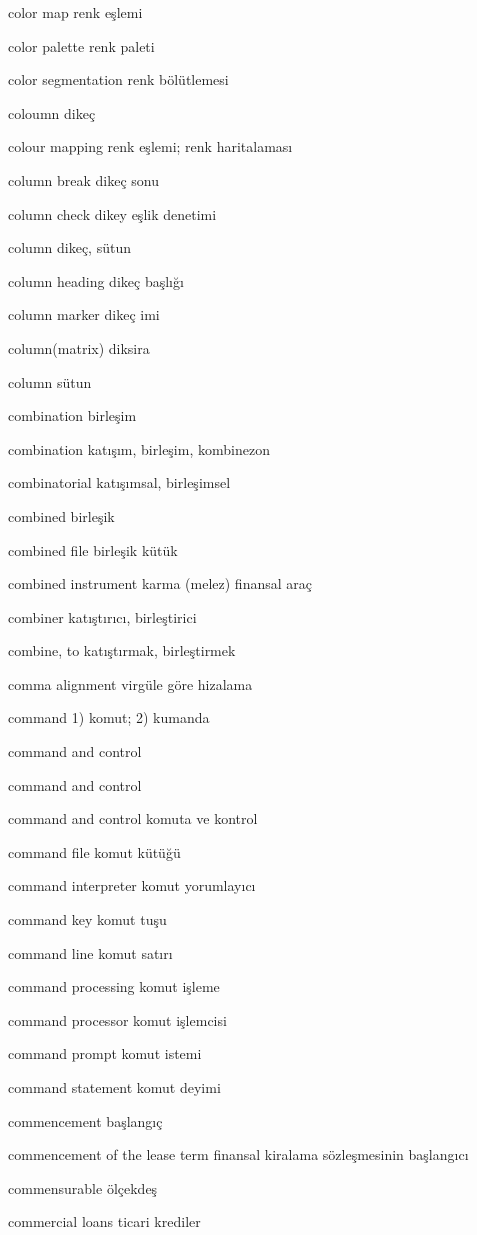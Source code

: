 \documentclass[12pt,fleqn]{article}\usepackage{../../common}
\begin{document}
color map renk eşlemi

color palette renk paleti

color segmentation renk bölütlemesi

coloumn dikeç

colour mapping renk eşlemi; renk haritalaması

column break dikeç sonu

column check dikey eşlik denetimi

column dikeç, sütun

column heading dikeç başlığı

column marker dikeç imi

column(matrix) diksira

column sütun

combination birleşim

combination katışım, birleşim, kombinezon

combinatorial katışımsal, birleşimsel

combined birleşik

combined file birleşik kütük

combined instrument karma (melez) finansal araç

combiner katıştırıcı, birleştirici

combine, to katıştırmak, birleştirmek

comma alignment virgüle göre hizalama

command 1) komut; 2) kumanda

command and control

command and control

command and control komuta ve kontrol

command file komut kütüğü

command interpreter komut yorumlayıcı

command key komut tuşu

command line komut satırı

command processing komut işleme

command processor komut işlemcisi

command prompt komut istemi

command statement komut deyimi

commencement başlangıç

commencement of the lease term finansal kiralama sözleşmesinin başlangıcı

commensurable ölçekdeş

commercial loans ticari krediler
\end{document}
